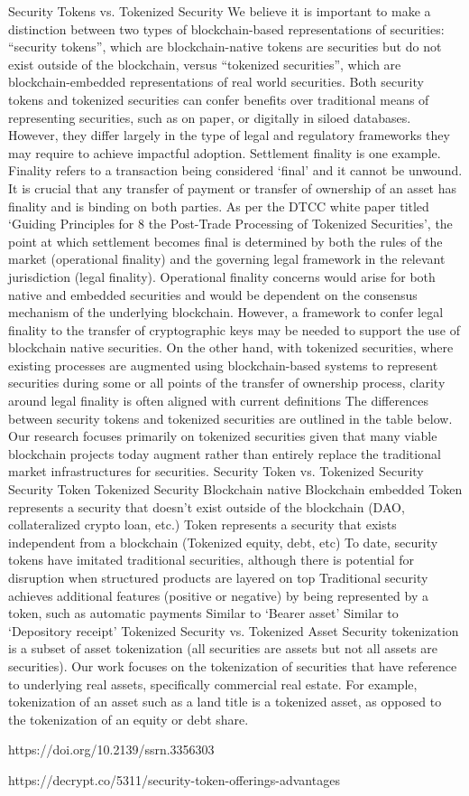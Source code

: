 Security Tokens vs. Tokenized Security
We believe it is important to make a distinction between two types of
blockchain-based representations of securities: “security tokens”, which are
blockchain-native tokens are securities but do not exist outside of the blockchain,
versus “tokenized securities”, which are blockchain-embedded representations of
real world securities.
Both security tokens and tokenized securities can confer benefits over traditional
means of representing securities, such as on paper, or digitally in siloed databases.
However, they differ largely in the type of legal and regulatory frameworks they may
require to achieve impactful adoption. Settlement finality is one example. Finality
refers to a transaction being considered ‘final’ and it cannot be unwound. It is crucial
that any transfer of payment or transfer of ownership of an asset has finality and is
binding on both parties. As per the DTCC white paper titled ‘Guiding Principles for
8
the Post-Trade Processing of Tokenized Securities’, the point at which settlement
becomes final is determined by both the rules of the market (operational finality)
and the governing legal framework in the relevant jurisdiction (legal finality).
Operational finality concerns would arise for both native and embedded securities
and would be dependent on the consensus mechanism of the underlying
blockchain. However, a framework to confer legal finality to the transfer of
cryptographic keys may be needed to support the use of blockchain native
securities. On the other hand, with tokenized securities, where existing processes are
augmented using blockchain-based systems to represent securities during some or
all points of the transfer of ownership process, clarity around legal finality is often
aligned with current definitions
The differences between security tokens and tokenized securities are outlined in the
table below. Our research focuses primarily on tokenized securities given that many
viable blockchain projects today augment rather than entirely replace the traditional
market infrastructures for securities.
Security Token vs. Tokenized Security
Security Token Tokenized Security
Blockchain native Blockchain embedded
Token represents a security that doesn’t
exist outside of the blockchain (DAO,
collateralized crypto loan, etc.)
Token represents a security that exists
independent from a blockchain
(Tokenized equity, debt, etc)
To date, security tokens have imitated
traditional securities, although there is
potential for disruption when structured
products are layered on top
Traditional security achieves additional
features (positive or negative) by being
represented by a token, such as
automatic payments
Similar to ‘Bearer asset’ Similar to ‘Depository receipt’
Tokenized Security vs. Tokenized Asset
Security tokenization is a subset of asset tokenization (all securities are assets but
not all assets are securities). Our work focuses on the tokenization of securities that
have reference to underlying real assets, specifically commercial real estate. For
example, tokenization of an asset such as a land title is a tokenized asset, as opposed
to the tokenization of an equity or debt share.


https://doi.org/10.2139/ssrn.3356303

https://decrypt.co/5311/security-token-offerings-advantages